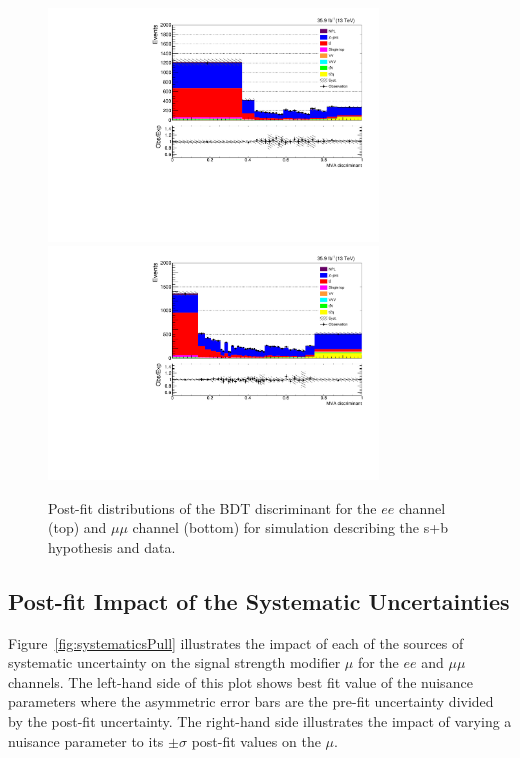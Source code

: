 \begin{figure}[!h]
\centering
\includegraphics[width=0.78\textwidth]{figs/results/postfit_ee.pdf}
\\
\includegraphics[width=0.78\textwidth]{figs/results/postfit_mumu.pdf}
\caption{
Post-fit distributions of the BDT discriminant for the $ee$ channel (top) and $\mu\mu$ channel (bottom) for simulation describing the s+b hypothesis and data.}
\label{fig:postfitBDT}
\end{figure}

\subsection{Post-fit Impact of the Systematic Uncertainties}\label{sec:uncertainitiesImpact}
Figure~\ref{fig:systematicsPull} illustrates the impact of each of the sources of systematic uncertainty on the signal strength modifier $\mu$ for the $ee$ and $\mu\mu$ channels.
The left-hand side of this plot shows best fit value of the nuisance parameters where the asymmetric error bars are the pre-fit uncertainty divided by the post-fit uncertainty.
The right-hand side illustrates the impact of varying a nuisance parameter to its $\pm \sigma$ post-fit values on the $\mu$.

